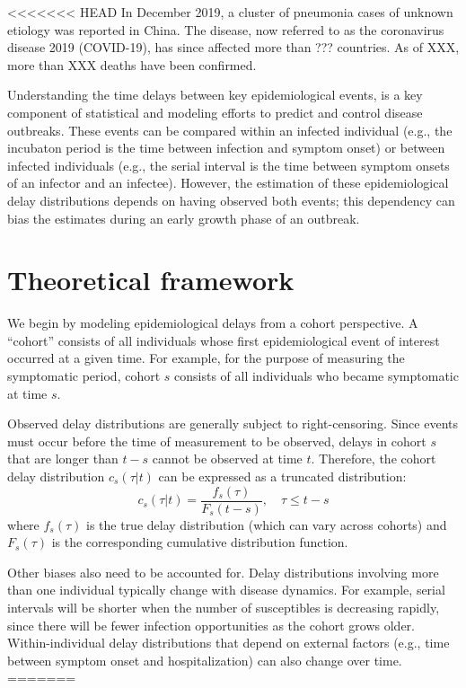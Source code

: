 
<<<<<<< HEAD
In December 2019, a cluster of pneumonia cases of unknown etiology was reported in China.
The disease, now referred to as the coronavirus disease 2019 (COVID-19), has since affected more than ??? countries.
As of XXX, more than XXX deaths have been confirmed.



Understanding the time delays between key epidemiological events, is a key component of statistical and modeling efforts to predict and control disease outbreaks. 
These events can be compared within an infected individual (e.g., the incubaton period is the time between infection and symptom onset) or between infected individuals (e.g., the serial interval is the time between symptom onsets of an infector and an infectee).
However, the estimation of these epidemiological delay distributions depends on having observed both events;
this dependency can bias the estimates during an early growth phase of an outbreak.

\section{Theoretical framework}

We begin by modeling epidemiological delays from a cohort perspective.
A ``cohort'' consists of all individuals whose first epidemiological event of interest occurred at a given time.
For example, for the purpose of measuring the symptomatic period, cohort $s$ consists of all individuals who became symptomatic at time $s$.


Observed delay distributions are generally subject to right-censoring.
Since events must occur before the time of measurement to be observed, delays in cohort $s$ that are longer than $t-s$ cannot be observed at time $t$.
Therefore, the cohort delay distribution $c_s(\tau|t)$ can be expressed as a truncated distribution:
\begin{equation}
c_s(\tau|t) = \frac{f_s(\tau)}{F_s(t-s)},\quad \tau \leq t-s
\end{equation}
where $f_s(\tau)$ is the true delay distribution (which can vary across cohorts) and $F_s(\tau)$ is the corresponding cumulative distribution function.

Other biases also need to be accounted for. Delay distributions involving more than one individual typically change with disease dynamics. For example, serial intervals will be shorter when the number of susceptibles is decreasing rapidly, since there will be fewer infection opportunities as the cohort grows older.
Within-individual delay distributions that depend on external factors (e.g., time between symptom onset and hospitalization) can also change over time.
=======
